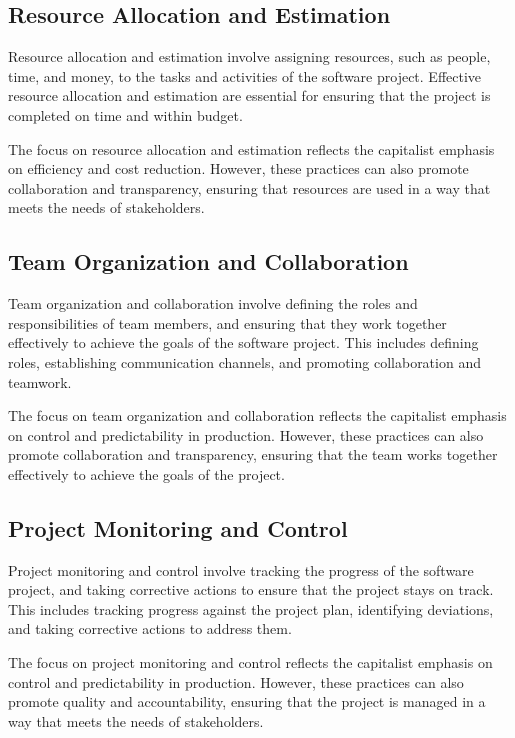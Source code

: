 \begin{refsection}
\begin{multicols}{2}
{\subsection{Resource Allocation and Estimation}

Resource allocation and estimation involve assigning resources, such as people, time, and money, to the tasks and activities of the software project. Effective resource allocation and estimation are essential for ensuring that the project is completed on time and within budget.

The focus on resource allocation and estimation reflects the capitalist emphasis on efficiency and cost reduction. However, these practices can also promote collaboration and transparency, ensuring that resources are used in a way that meets the needs of stakeholders.

\subsection{Team Organization and Collaboration}

Team organization and collaboration involve defining the roles and responsibilities of team members, and ensuring that they work together effectively to achieve the goals of the software project. This includes defining roles, establishing communication channels, and promoting collaboration and teamwork.

The focus on team organization and collaboration reflects the capitalist emphasis on control and predictability in production. However, these practices can also promote collaboration and transparency, ensuring that the team works together effectively to achieve the goals of the project.

\subsection{Project Monitoring and Control}

Project monitoring and control involve tracking the progress of the software project, and taking corrective actions to ensure that the project stays on track. This includes tracking progress against the project plan, identifying deviations, and taking corrective actions to address them.

The focus on project monitoring and control reflects the capitalist emphasis on control and predictability in production. However, these practices can also promote quality and accountability, ensuring that the project is managed in a way that meets the needs of stakeholders.

}
\end{multicols}
\end{refsection}
